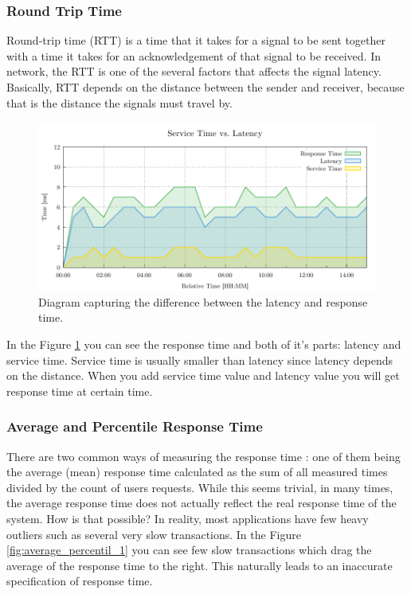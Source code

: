 \subsubsection{Round Trip Time}
Round-trip time (RTT) is a time that it takes for a signal to be sent together with a time it takes for an acknowledgement of that signal to be received. In network, the RTT is one of the several factors that affects the signal latency. Basically, RTT depends on the distance between the sender and receiver, because that is the distance the signals must travel by.


\begin{figure}[H]
  \centering
  \includegraphics[width=15cm]{obrazky-figures/latency.pdf}
  \caption{Diagram capturing the difference between the latency and response time.}
  \label{fig:latency_vs_service_time}
\end{figure}

In the Figure \ref{fig:latency_vs_service_time} you can see the response time and both of it's parts: latency and service time. Service time is usually smaller than latency since latency depends on the distance. When you add service time value and latency value you will get response time at certain time.

\subsubsection*{Average and Percentile Response Time}
There are two common ways of measuring the response time \cite{Kopp:RPT}: one of them being the average (mean) response time calculated as the sum of all measured times divided by the count of users requests. While this seems trivial, in many times, the average response time does not actually reflect the real response time of the system. How is that possible? In reality, most applications have few heavy outliers such as several very slow transactions. In the Figure \ref{fig:average_percentil_1} you can see few slow transactions which drag the average of the response time to the right. This naturally leads to an inaccurate specification of response time.


